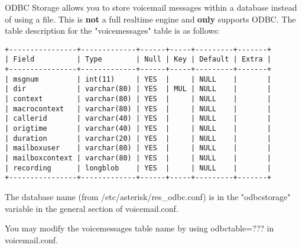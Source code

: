 

ODBC Storage allows you to store voicemail messages within a database 
instead of using a file.  This is \textbf{not} a full realtime engine and 
\textbf{only} supports ODBC.  The table description for the "voicemessages" 
table is as follows:

\begin{verbatim}
+----------------+-------------+------+-----+---------+-------+
| Field          | Type        | Null | Key | Default | Extra |
+----------------+-------------+------+-----+---------+-------+
| msgnum         | int(11)     | YES  |     | NULL    |       |
| dir            | varchar(80) | YES  | MUL | NULL    |       |
| context        | varchar(80) | YES  |     | NULL    |       |
| macrocontext   | varchar(80) | YES  |     | NULL    |       |
| callerid       | varchar(40) | YES  |     | NULL    |       |
| origtime       | varchar(40) | YES  |     | NULL    |       |
| duration       | varchar(20) | YES  |     | NULL    |       |
| mailboxuser    | varchar(80) | YES  |     | NULL    |       |
| mailboxcontext | varchar(80) | YES  |     | NULL    |       |
| recording      | longblob    | YES  |     | NULL    |       |
+----------------+-------------+------+-----+---------+-------+
\end{verbatim}

The database name (from /etc/asterisk/res\_odbc.conf) is in the 
"odbcstorage" variable in the general section of voicemail.conf.

You may modify the voicemessages table name by using 
odbctable=??? in voicemail.conf.


